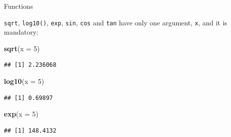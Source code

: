 \documentclass[ignorenonframetext,]{beamer}
\newenvironment{Shaded}{\begin{snugshade}}{\end{snugshade}}
\newcommand{\DataTypeTok}[1]{\textcolor[rgb]{0.13,0.29,0.53}{#1}}
\newcommand{\DecValTok}[1]{\textcolor[rgb]{0.00,0.00,0.81}{#1}}
\newcommand{\KeywordTok}[1]{\textcolor[rgb]{0.13,0.29,0.53}{\textbf{#1}}}
\newcommand{\NormalTok}[1]{#1}
\begin{document}
\begin{frame}[fragile]{Functions}
\protect\hypertarget{functions-4}{}

\texttt{sqrt}, \texttt{log10()}, \texttt{exp}, \texttt{sin},
\texttt{cos} and \texttt{tan} have only one argument, \texttt{x}, and it
is mandatory:

\begin{Shaded}
\begin{Highlighting}[]
\KeywordTok{sqrt}\NormalTok{(}\DataTypeTok{x =} \DecValTok{5}\NormalTok{)}
\end{Highlighting}
\end{Shaded}

\begin{verbatim}
## [1] 2.236068
\end{verbatim}

\begin{Shaded}
\begin{Highlighting}[]
\KeywordTok{log10}\NormalTok{(}\DataTypeTok{x =} \DecValTok{5}\NormalTok{)}
\end{Highlighting}
\end{Shaded}

\begin{verbatim}
## [1] 0.69897
\end{verbatim}

\begin{Shaded}
\begin{Highlighting}[]
\KeywordTok{exp}\NormalTok{(}\DataTypeTok{x =} \DecValTok{5}\NormalTok{)}
\end{Highlighting}
\end{Shaded}

\begin{verbatim}
## [1] 148.4132
\end{verbatim}

\end{frame}
\end{document}
